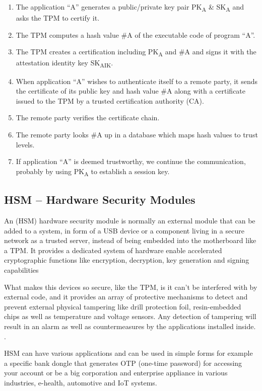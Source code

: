 \begin{enumerate}
	\item The application “A” generates a public/private key pair PK\textsubscript{A} \& SK\textsubscript{A} and asks the \gls{TPM} to certify it.
	\item The TPM computes a hash value \#A of the executable code of program “A”.
	\item The TPM creates a certification including PK\textsubscript{A} and \#A and signs it with the attestation identity key SK\textsubscript{AIK}.
	\item When application “A” wishes to authenticate itself to a remote party, it sends the certificate of its public key and hash value \#A along with a certificate issued to the TPM by a trusted certification authority (\gls{CA}).
	\item The remote party verifies the certificate chain.
	\item The remote party looks \#A up in a database which maps hash values to trust levels.
	\item If application “A” is deemed trustworthy, we continue the communication,
	probably by using PK\textsubscript{A} to establish a session key.
\end{enumerate}

\subsection{HSM – Hardware Security Modules} %
\label{ssec:hardware_security_modules}

An (\gls{HSM}) hardware security module is normally an external module that can be added to a system, in form of a \gls{USB} device or a component living in a secure network as a trusted server, instead of being embedded into the motherboard like a \gls{TPM}. It provides a dedicated system of hardware enable accelerated cryptographic functions like encryption, decryption, key generation and signing capabilities \cite{hsm:1}

What makes this devices so secure, like the \gls{TPM}, is it can't be interfered with by external code, and it provides an array of protective mechanisms to detect and prevent external physical tampering like drill protection foil, resin-embedded chips as well as temperature and voltage sensors. Any detection of tampering will result in an alarm as well as countermeasures by the applications installed inside. \cite{hsm:2}.

\gls{HSM} can have various applications and can be used in simple forms for example a specific bank dongle that generates \gls{OTP} (one-time password) for accessing your account or be a big corporation and enterprise appliance in various industries, e-health, automotive and \gls{IoT} systems.


